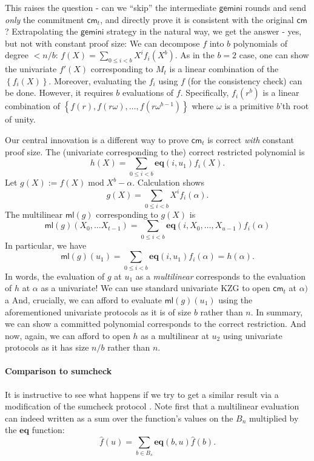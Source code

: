 \documentclass[11pt]{article} %
\newcommand{\gemini}{\ensuremath{\mathsf{gemini}}\xspace}
\newcommand{\cm}{\ensuremath{\mathsf{cm}}\xspace}
\newcommand{\defeq}{:=}
\renewcommand{\mod}{\ensuremath{\;\mathrm{mod}\;}}
\newcommand{\prv}{\ensuremath{\mathsf{\mathbf{P}}}\xspace}
\newcommand{\ver}{\ensuremath{\mathsf{\mathbf{V}}}\xspace}
\newcommand{\set}[1]{\ensuremath{\left\{#1\right\}}\xspace}
\renewcommand{\g}{\ensuremath{\mathsf{g}}\xspace}
\newcommand{\eq}{\ensuremath{\mathsf{eq}}\xspace}
\renewcommand{\eq}{\ensuremath{\mathbf{eq}}\xspace}
\newcommand{\mle}[1]{\ensuremath{\mathsf{ml}(#1)}\xspace}
\newcommand{\B}[1]{\ensuremath{B_{#1}}\xspace}
\begin{document}
This raises the question - can we ``skip'' the intermediate \gemini rounds and send \emph{only} the commitment $\cm_t$, and directly prove it is consistent with the original \cm?
Extrapolating the \gemini strategy in the natural way, we get the answer - yes, but not with constant proof size:
We can decompose $f$ into $b$ polynomials of degree $<n/b$: $f(X)=\sum_{0\leq i <b} X^i f_i(X^b)$.
As in the $b=2$ case, one can show the univariate $f'(X)$ corresponding to $M_t$ is a linear combination
of the \set{f_i(X)}. Moreover, evaluating the $f_i$ using $f$ (for the consistency check) can be done.
However, it requires $b$ evaluations of $f$. Specifically,
$f_i(r^b)$ is a linear combination of  $\set{f(r),f(r\omega),\ldots,f(r\omega^{b-1})}$ where $\omega$ is a primitive $b$'th root of unity.


Our central innovation is a different way to prove $\cm_t$ is correct \emph{with} constant proof size.
The (univariate corresponding to the) correct restricted polynomial is 
\[h(X) = \sum_{0\leq i < b} \eq(i,u_1)f_i(X).\]
Let $g(X)\defeq f(X) \mod X^b-\alpha$.
Calculation shows
\[g(X)= \sum_{0\leq i < b} X^i f_i(\alpha).\]
The multilinear $\mle{g}$ corresponding to $g(X)$ is 
\[\mle{g}(X_0,\ldots X_{t-1}) = \sum_{0\leq i < b} \eq(i,X_0,\ldots,X_{u-1})f_i(\alpha)
\]
In particular, we have 
\[\mle{g}(u_1) = \sum_{0\leq i < b} \eq(i,u_1)f_i(\alpha)=h(\alpha).\]
In words, the evaluation of $g$ at $u_1$ as a \emph{multilinear} corresponds to 
the evaluation of $h$ at $\alpha$ as a univariate!
We can use standard univariate KZG to open $\cm_t$ at $\alpha)$a
And, crucially, we can afford to evaluate $\mle{g}(u_1)$ using the aforementioned univariate protocols as it is of size $b$ rather than $n$.
In summary, we can show a committed polynomial corresponds to the correct restriction. And now, again, we can afford to open $h$ as a multilinear at $u_2$ using univariate protocols
as it has size $n/b$ rather than $n$.
\paragraph{Comparison to sumcheck}
It is instructive to see what  happens if we try to get a similar result via a modification of the sumcheck protocol \cite{lfkn}.
Note first that a multilinear evaluation can indeed   written as a sum over the function's values on the \B{n} multiplied by the \eq function:
$$ \hat{f}(u) = \sum_{b \in B_s} \eq(b, u) \hat{f}(b). $$
\end{document}
